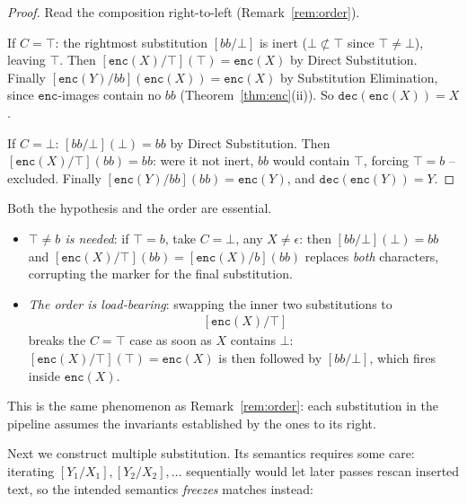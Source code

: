 \documentclass[runningheads,envcountsect]{llncs}
\renewenvironment{remark}
  {\rmfamily\trivlist\item[\hskip\labelsep{\itshape Remark.}]\ignorespaces}
  {\endtrivlist}
\begin{document}
\begin{proof}
    Read the composition right-to-left (Remark~\ref{rem:order}).

    If $C = \top$: the rightmost substitution $[bb/\bot]$ is inert ($\bot \not\subset \top$ since $\top \neq \bot$), leaving $\top$. Then $[\mathtt{enc}(X)/\top](\top) = \mathtt{enc}(X)$ by Direct Substitution. Finally $[\mathtt{enc}(Y)/bb](\mathtt{enc}(X)) = \mathtt{enc}(X)$ by Substitution Elimination, since $\mathtt{enc}$-images contain no $bb$ (Theorem~\ref{thm:enc}(ii)). So $\mathtt{dec}(\mathtt{enc}(X)) = X$.

    If $C = \bot$: $[bb/\bot](\bot) = bb$ by Direct Substitution. Then $[\mathtt{enc}(X)/\top](bb) = bb$: were it not inert, $bb$ would contain $\top$, forcing $\top = b$ -- excluded. Finally $[\mathtt{enc}(Y)/bb](bb) = \mathtt{enc}(Y)$, and $\mathtt{dec}(\mathtt{enc}(Y)) = Y$.
\end{proof}

\begin{remark}
    Both the hypothesis and the order are essential.
    \begin{itemize}
        \item \emph{$\top \neq b$ is needed}: if $\top = b$, take $C = \bot$, any $X \neq \epsilon$: then $[bb/\bot](\bot) = bb$ and $[\mathtt{enc}(X)/\top](bb) = [\mathtt{enc}(X)/b](bb)$ replaces \emph{both} characters, corrupting the marker for the final substitution.
        \item \emph{The order is load-bearing}: swapping the inner two substitutions to
        \begin{align*}
            [bb/\bot]\,[\mathtt{enc}(X)/\top]
        \end{align*}
        breaks the $C = \top$ case as soon as $X$ contains $\bot$: $[\mathtt{enc}(X)/\top](\top) = \mathtt{enc}(X)$ is then followed by $[bb/\bot]$, which fires inside $\mathtt{enc}(X)$.
    \end{itemize}
    This is the same phenomenon as Remark~\ref{rem:order}: each substitution in the pipeline assumes the invariants established by the ones to its right.
\end{remark}

Next we construct multiple substitution. Its semantics requires some care: iterating $[Y_1/X_1], [Y_2/X_2], \dots$ sequentially would let later passes rescan inserted text, so the intended semantics \emph{freezes} matches instead:
\end{document}
